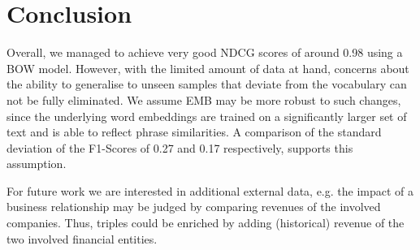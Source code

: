 \section{Conclusion}
Overall, we managed to achieve very good NDCG scores of around 0.98 using a BOW model.
However, with the limited amount of data at hand, concerns about the ability to generalise to unseen samples that deviate from the vocabulary can not be fully eliminated.
We assume EMB may be more robust to such changes, since the underlying word embeddings are trained on a significantly larger set of text and is able to reflect phrase similarities.
A comparison of the standard deviation of the F1-Scores of 0.27 and 0.17 respectively, supports this assumption.

For future work we are interested in additional external data, e.g. the impact of a business relationship may be judged by comparing revenues of the involved companies.
Thus, triples could be enriched by adding (historical) revenue of the two involved financial entities. 



%


